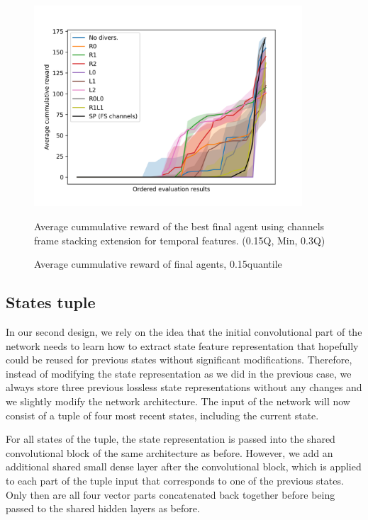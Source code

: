 \begin{figure}[!ht]
    \centering
    \includegraphics*[width=10cm]{../img/FSChannelsOrderedQ15.png}

    \caption{Average cummulative reward of final agents, 0.15quantile}
    \label{FSChannelsOrderedQ15}
    \medskip
    \small 
    Average cummulative reward of the best final agent using channels frame stacking extension for temporal features. 
    (0.15Q, Min, 0.3Q)

\end{figure}

\newpage

\subsection{States tuple}
In our second design, we rely on the idea that the initial convolutional part of the network needs to learn how to extract state feature representation that hopefully could be reused for previous states without significant modifications.
Therefore, instead of modifying the state representation as we did in the previous case, we always store three previous lossless state representations without any changes and we slightly modify the network architecture.
The input of the network will now consist of a tuple of four most recent states, including the current state.

For all states of the tuple, the state representation is passed into the shared convolutional block of the same architecture as before.
However, we add an additional shared small dense layer after the convolutional block, which is applied to each part of the tuple input that corresponds to one of the previous states.
Only then are all four vector parts concatenated back together before being passed to the shared hidden layers as before.


